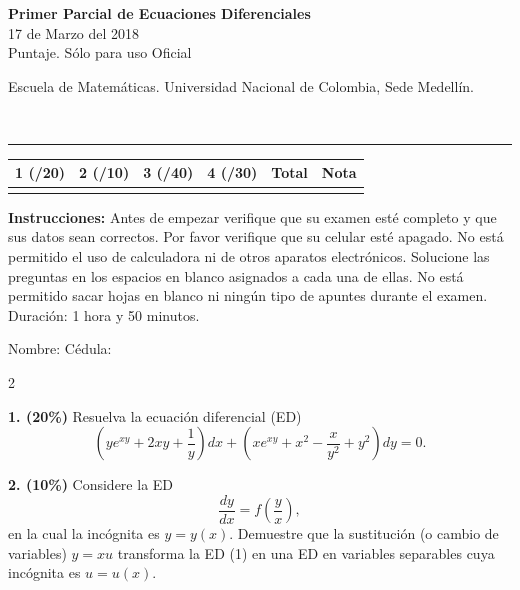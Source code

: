 \documentclass[11pt]{article}
\begin{document}
\noindent
\begin{minipage}[t]{0.62\linewidth}
  {\bfseries\large Primer Parcial de Ecuaciones Diferenciales}\\[2pt]
  {\small 17 de Marzo del 2018}\\
  {\small Puntaje. Sólo para uso Oficial}
\end{minipage}%
\hfill
\begin{minipage}[t]{0.35\linewidth}
  \raggedleft\small Escuela de Matemáticas. Universidad Nacional de Colombia, Sede Medellín.
\end{minipage}\\[4pt]
\rule{\linewidth}{0.6pt}

\vspace{4pt}
\noindent
\begin{tabular}{|c|c|c|c|c|c|}
\hline
1 (/20) & 2 (/10) & 3 (/40) & 4 (/30) & Total & Nota \\
\hline
 & & & & & \\
\hline
\end{tabular}

\vspace{6pt}
\noindent\textbf{Instrucciones:} Antes de empezar verifique que su examen esté completo y que sus datos sean correctos. Por favor verifique que su celular esté apagado. No está permitido el uso de calculadora ni de otros aparatos electrónicos. Solucione las preguntas en los espacios en blanco asignados a cada una de ellas. No está permitido sacar hojas en blanco ni ningún tipo de apuntes durante el examen. Duración: 1 hora y 50 minutos.

\vspace{8pt}
\noindent Nombre: \makebox[0.45\linewidth]{\hrulefill} \hfill Cédula: \makebox[0.3\linewidth]{\hrulefill}

\begin{multicols}{2}

\textbf{1. (20\%)} Resuelva la ecuación diferencial (ED)
\small
\[
\left(ye^{xy}+2xy+\frac{1}{y}\right)dx+\left(xe^{xy}+x^2-\frac{x}{y^2}+y^2\right)dy=0.
\]
\normalsize

\vspace{6cm}

\columnbreak

\textbf{2. (10\%)} Considere la ED
\[
\frac{dy}{dx}=f\left(\frac{y}{x}\right), \tag{1}
\]
en la cual la incógnita es $y=y(x)$. Demuestre que la sustitución (o cambio de variables) $y=xu$ transforma la ED (1) en una ED en variables separables cuya incógnita es $u=u(x)$.

\end{multicols}
\end{document}
